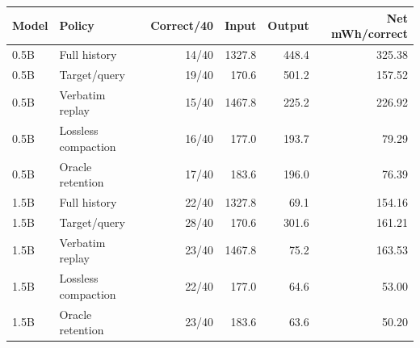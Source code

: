 \begin{tabular}{llrrrr}
\toprule
Model & Policy & Correct/40 & Input & Output & Net mWh/correct \\
\midrule
0.5B & Full history & 14/40 & 1327.8 & 448.4 & 325.38 \\
0.5B & Target/query & 19/40 & 170.6 & 501.2 & 157.52 \\
0.5B & Verbatim replay & 15/40 & 1467.8 & 225.2 & 226.92 \\
0.5B & Lossless compaction & 16/40 & 177.0 & 193.7 & 79.29 \\
0.5B & Oracle retention & 17/40 & 183.6 & 196.0 & 76.39 \\
\midrule
1.5B & Full history & 22/40 & 1327.8 & 69.1 & 154.16 \\
1.5B & Target/query & 28/40 & 170.6 & 301.6 & 161.21 \\
1.5B & Verbatim replay & 23/40 & 1467.8 & 75.2 & 163.53 \\
1.5B & Lossless compaction & 22/40 & 177.0 & 64.6 & 53.00 \\
1.5B & Oracle retention & 23/40 & 183.6 & 63.6 & 50.20 \\
\midrule
\bottomrule
\end{tabular}
